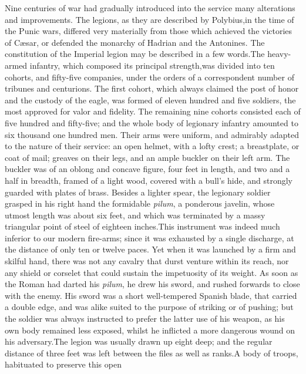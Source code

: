 Nine centuries of war had gradually introduced into the service
many alterations and improvements. The legions, as they are
described by Polybius,\footnotemark[41] in the time of the Punic wars, differed
very materially from those which achieved the victories of Cæsar,
or defended the monarchy of Hadrian and the Antonines. The
constitution of the Imperial legion may be described in a few
words.\footnotemark[42] The heavy-armed infantry, which composed its principal
strength,\footnotemark[43] was divided into ten cohorts, and fifty-five
companies, under the orders of a correspondent number of tribunes
and centurions. The first cohort, which always claimed the post
of honor and the custody of the eagle, was formed of eleven
hundred and five soldiers, the most approved for valor and
fidelity. The remaining nine cohorts consisted each of five
hundred and fifty-five; and the whole body of legionary infantry
amounted to six thousand one hundred men. Their arms were
uniform, and admirably adapted to the nature of their service: an
open helmet, with a lofty crest; a breastplate, or coat of mail;
greaves on their legs, and an ample buckler on their left arm.
The buckler was of an oblong and concave figure, four feet in
length, and two and a half in breadth, framed of a light wood,
covered with a bull’s hide, and strongly guarded with plates of
brass. Besides a lighter spear, the legionary soldier grasped in
his right hand the formidable \textit{pilum}, a ponderous javelin, whose
utmost length was about six feet, and which was terminated by a
massy triangular point of steel of eighteen inches.\footnotemark[44] This
instrument was indeed much inferior to our modern fire-arms;
since it was exhausted by a single discharge, at the distance of
only ten or twelve paces. Yet when it was launched by a firm and
skilful hand, there was not any cavalry that durst venture within
its reach, nor any shield or corselet that could sustain the
impetuosity of its weight. As soon as the Roman had darted his
\textit{pilum}, he drew his sword, and rushed forwards to close with the
enemy. His sword was a short well-tempered Spanish blade, that
carried a double edge, and was alike suited to the purpose of
striking or of pushing; but the soldier was always instructed to
prefer the latter use of his weapon, as his own body remained
less exposed, whilst he inflicted a more dangerous wound on his
adversary.\footnotemark[45] The legion was usually drawn up eight deep; and the
regular distance of three feet was left between the files as well
as ranks.\footnotemark[46] A body of troops, habituated to preserve this open

